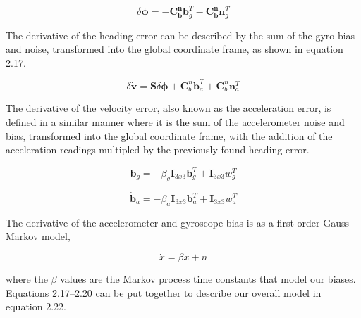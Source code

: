 \begin{equation}
  \delta{\dot{\boldsymbol{\phi}}} = 
  - \boldsymbol{C_b^n}\boldsymbol{b}_g^T - \boldsymbol{C_b^n}\boldsymbol{n}_g^T
\end{equation}  

The derivative of the heading error can be described by the sum of the gyro bias 
and noise, transformed into the global coordinate frame, as shown in equation 2.17.

\begin{equation}
  \delta{\dot{\boldsymbol{v}}} = 
  \boldsymbol{S}\delta\boldsymbol{\phi} + \boldsymbol{C}^n_b\boldsymbol{b}_a^T + \boldsymbol{C}^n_b\boldsymbol{n}^T_a
\end{equation}  

The derivative of the velocity error, also known as the acceleration error, is 
defined in a similar manner where it is the sum of the accelerometer noise and 
bias, transformed into the global coordinate frame, with the addition of the 
acceleration readings multipled by the previously found heading error. 

\begin{equation}
  \dot{\boldsymbol{b}}_g = 
  - \beta_g\boldsymbol{I}_{3x3}\boldsymbol{b}_g^T + \boldsymbol{I}_{3x3}w_g^T
\end{equation}  

\begin{equation}
  \dot{\boldsymbol{b}}_a = 
  - \beta_a\boldsymbol{I}_{3x3}\boldsymbol{b}_a^T + \boldsymbol{I}_{3x3}w_a^T
\end{equation}  

The derivative of the accelerometer and gyroscope bias is as a first order Gauss-Markov model,

\begin{equation}
  \dot{x} = \beta x + n
\end{equation}

where the $\beta$ values are the Markov process time constants that model our
biases. Equations 2.17--2.20 can be put together to describe our overall model 
in equation 2.22. 

